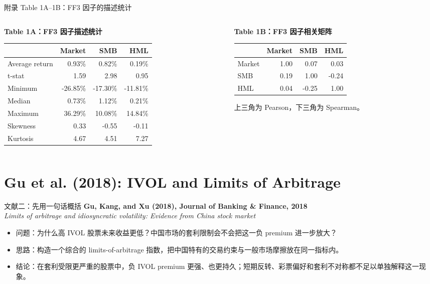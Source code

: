 \documentclass[aspectratio=169,10pt]{beamer}
\newcommand{\paperivol}{Gu, Kang, and Xu (2018)}
\begin{document}
\begin{frame}{附录 Table 1A--1B：FF3 因子的描述统计}
	\begin{columns}[t]
		\begin{column}{0.52\textwidth}
			\textbf{Table 1A：FF3 因子描述统计}
			\scriptsize
			\begin{tabular}{lrrr}
				\toprule
				& Market & SMB & HML\\
				\midrule
				Average return & 0.93\% & 0.82\% & 0.19\%\\
				t-stat & 1.59 & 2.98 & 0.95\\
				Minimum & -26.85\% & -17.30\% & -11.81\%\\
				Median & 0.73\% & 1.12\% & 0.21\%\\
				Maximum & 36.29\% & 10.08\% & 14.84\%\\
				Skewness & 0.33 & -0.55 & -0.11\\
				Kurtosis & 4.67 & 4.51 & 7.27\\
				\bottomrule
			\end{tabular}
		\end{column}
		\begin{column}{0.45\textwidth}
			\textbf{Table 1B：FF3 因子相关矩阵}
			\scriptsize
			\begin{tabular}{lrrr}
				\toprule
				& Market & SMB & HML\\
				\midrule
				Market & 1.00 & 0.07 & 0.03\\
				SMB & 0.19 & 1.00 & -0.24\\
				HML & 0.04 & -0.25 & 1.00\\
				\bottomrule
			\end{tabular}
			\par\vspace{4pt}
			\scriptsize 上三角为 Pearson，下三角为 Spearman。
		\end{column}
	\end{columns}
\end{frame}

\section{Gu et al. (2018): IVOL and Limits of Arbitrage}

\begin{frame}{文献二：先用一句话概括}
	\textbf{\paperivol, Journal of Banking \& Finance, 2018}\\
	\textit{Limits of arbitrage and idiosyncratic volatility: Evidence from China stock market}
	\vspace{6pt}
	\begin{itemize}
		\item 问题：为什么高 IVOL 股票未来收益更低？中国市场的套利限制会不会把这一负 premium 进一步放大？
		\item 思路：构造一个综合的 limits-of-arbitrage 指数，把中国特有的交易约束与一般市场摩擦放在同一指标内。
		\item 结论：在套利受限更严重的股票中，负 IVOL premium 更强、也更持久；短期反转、彩票偏好和套利不对称都不足以单独解释这一现象。
	\end{itemize}
\end{frame}
\end{document}
